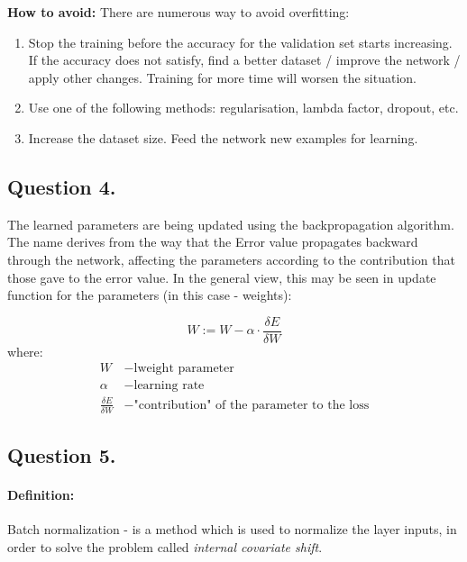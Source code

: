 \documentclass[a4paper]{iacas}
\begin{document}
\newline
\textbf{How to avoid: }There are numerous way to avoid overfitting:
\begin{enumerate}
\item Stop the training before the accuracy for the validation set starts increasing. If the accuracy does not satisfy, find a better dataset / improve the network / apply other changes. Training for more time will worsen the situation.
\item Use one of the following methods: regularisation, lambda factor, dropout, etc.
\item Increase the dataset size. Feed the network new examples for learning.
\end{enumerate}







\newpage
\subsection{Question 4.}
The learned parameters are being updated using the backpropagation algorithm. The name derives from the way that the Error value propagates backward through the network, affecting the parameters according to the contribution that those gave to the error value. In the general view, this may be seen in update function for the parameters (in this case - weights):

\begin{equation*}
W := W - \alpha\cdot\frac{\delta E}{\delta W}
\end{equation*}
where:
\begin{align*} 
W &- \text{lweight parameter} \\
\alpha &- \text{learning rate} \\
\frac{\delta E}{\delta W} &- \text{"contribution" of the parameter to the loss}
\end{align*}

\newpage
\subsection{Question 5.}
\paragraph{\textbf{Definition:}}Batch normalization - is a method which is used to normalize the layer inputs, in order to solve the problem called \textit{internal covariate shift}. 
\end{document}
